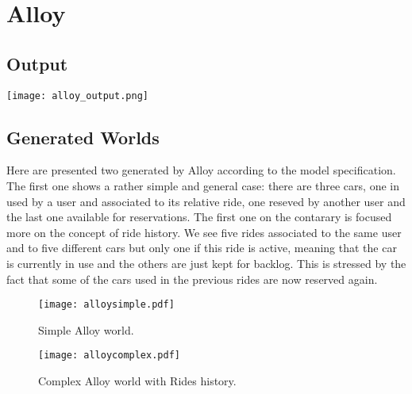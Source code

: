 \pagebreak
\section{Alloy}


\pagebreak
\subsection{Output}
\centerline{
    \hfill
    \texttt{[image: alloy\_output.png]}
    \hfill
}

\pagebreak
\subsection{Generated Worlds}
Here are presented two generated by Alloy according to the model specification.
The first one shows a rather simple and general case: there are three cars,
one in used by a user and associated to its relative ride,
one reseved by another user and the last one available for reservations.
The first one on the contarary is focused more on the concept of ride history.
We see five rides associated to the same user and to five different cars
but only one if this ride is active, meaning that the car is currently in use and the
others are just kept for backlog. This is stressed by the fact that some of the cars used 
in the previous rides are now reserved again.

\begin{figure}
    \texttt{[image: alloysimple.pdf]}
    \caption{Simple Alloy world.}
\end{figure}

\begin{figure}
    \texttt{[image: alloycomplex.pdf]}
    \caption{Complex Alloy world with Rides history.}
\end{figure}
